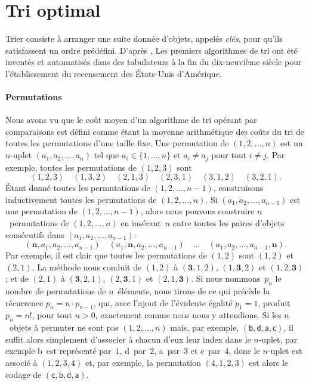 \section{Tri optimal}
\label{sec:opt_sort}

Trier consiste à arranger une suite donnée d'objets, appelés
\emph{clés}, pour qu'ils satisfassent un ordre
prédéfini. D'après \cite{Knuth_1998}, Les premiers algorithmes de tri
ont été inventés et automatisés dans des tabulateurs à la fin du
dix-neuvième siècle pour l'établissement du recensement des États-Unis
d'Amérique.

\paragraph{Permutations}
\label{par:permutations}

\hspace*{-10pt} Nous avons vu  que le coût
moyen d'un algorithme de tri opérant par comparaisons est défini comme
étant la moyen\-ne arithmétique des coûts du tri de toutes les
permutations d'une taille fixe. Une permutation de \((1,2,\dots,n)\)
est un \(n\)-uplet \((a_1,a_2,\dots,a_n)\) tel que \(a_i \in
\{1,\dots,n\}\) et \({a_i \neq a_j}\) pour tout \({i \neq j}\). Par
exemple, toutes les permutations de \((1,2,3)\) sont
\begin{equation*}
(1,2,3) \quad (1,3,2) \quad (2,1,3) \quad (2,3,1) \quad (3,1,2) \quad
(3,2,1).
\end{equation*}
Étant donné toutes les permutations de \((1,2,\dots,n-1)\),
construisons inductivement toutes les permutations de
\((1,2,\dots,n)\). Si \((a_1,a_2,\dots,a_{n-1})\) est une permutation
de \((1,2,\dots,n-1)\), alors nous pouvons construire
\(n\)~permutations de \((1,2,\dots,n)\) en insérant~\(n\) entre toutes
les paires d'objets consécutifs dans \((a_1,a_2,\dots,a_{n-1})\):
\begin{equation*}
(\boldsymbol{n},a_1,a_2,\dots,a_{n-1})\quad
(a_1,\boldsymbol{n},a_2,\dots,a_{n-1})\quad \ldots \quad
(a_1,a_2,\dots,a_{n-1},\boldsymbol{n}).
\end{equation*}
Par exemple, il est clair que toutes les permutations de \((1,2)\)
sont \((1,2)\) et \((2,1)\). La méthode nous conduit de \((1,2)\) à
\((\boldsymbol{3},1,2)\), \((1,\boldsymbol{3},2)\) et
\((1,2,\boldsymbol{3})\); et de \((2,1)\) à \((\boldsymbol{3},2,1)\),
\((2,\boldsymbol{3},1)\) et \((2,1,\boldsymbol{3})\). Si nous
nommons~\(p_n\) le nombre de permutations de \(n\)~éléments, nous
tirons de ce qui précède la récurrence \(p_n = n \cdot p_{n-1}\), qui,
avec l'ajout de l'évidente égalité \(p_1 = 1\), produit \(p_n = n!\),
pour tout \({n > 0}\), exactement comme nous nous y attendions. Si les
\(n\)~objets à permuter ne sont pas \((1,2,\dots,n)\) mais, par
exemple, \((\textsf{b},\textsf{d},\textsf{a},\textsf{c})\), il suffit
alors simplement d'associer à chacun d'eux leur index dans le
\(n\)-uplet, par exemple \textsf{b}~est représenté par~\(1\),
\textsf{d}~par~\(2\), \textsf{a}~par~\(3\) et \textsf{c}~par~\(4\),
donc le \(n\)-uplet est associé à \((1,2,3,4)\) et, par exemple, la
permutation \((4,1,2,3)\) est alors le codage de
\((\textsf{c},\textsf{b},\textsf{d},\textsf{a})\).

